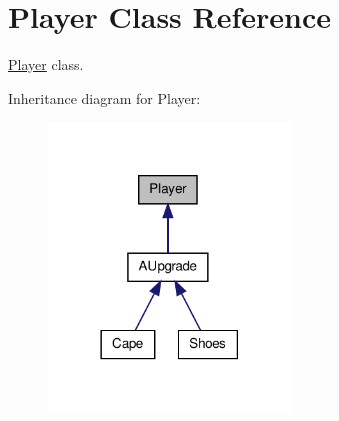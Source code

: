 \hypertarget{class_player}{\section{Player Class Reference}
\label{class_player}
}


\hyperlink{class_player}{Player} class.  




Inheritance diagram for Player\-:\nopagebreak
\begin{figure}[H]
\begin{center}
\leavevmode
\includegraphics[width=182pt]{class_player__inherit__graph}
\end{center}
\end{figure}
